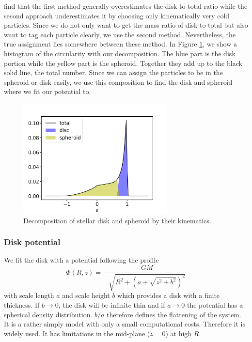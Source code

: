 \cite{AurigaGrand} find that the first method generally overestimates the disk-to-total ratio while the second approach underestimates it by choosing only kinematically very cold particles. Since we do not only want to get the mass ratio of disk-to-total but also want to tag each particle clearly, we use the second method. Nevertheless, the true assignment lies somewhere between these method. In Figure \ref{fig:decomposition}, we show a histogram of the circularity with our decomposition. The blue part is the disk portion while the yellow part is the spheroid. Together they add up to the black solid line, the total number. 
Since we can assign the particles to be in the spheroid or disk easily, we use this composition to find the disk and spheroid where we fit our potential to.

\begin{figure}
    \centering
    \includegraphics[width=0.7\textwidth]{plots/Auriga/decomposition_snap_127.png}
    \caption{Decomposition of stellar disk and spheroid by their kinematics. }
    \label{fig:decomposition}
\end{figure}
\subsubsection{Disk potential}\label{subsubsec:disk_pot}
We fit the disk with a \citet{MNprofile} potential following the profile 
\begin{equation}
\Phi(R,z) = -\frac{GM}{\sqrt{R^2+(a+\sqrt{z^2+b^2})^2}}
\end{equation} 
with scale length $a$ and scale height $b$ which provides a disk with a finite thickness. If $b\rightarrow 0$, the disk will be infinite thin and if $a \rightarrow 0$ the potential has a spherical density distribution. $b/a$ therefore defines the flattening of the system. It is a rather simply model with only a small computational costs. Therefore it is widely used. It has limitations in the mid-plane ($z=0$) at high $R$. 


